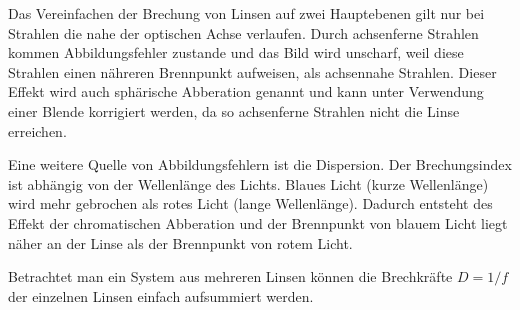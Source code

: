 Das Vereinfachen der Brechung von Linsen auf zwei Hauptebenen gilt nur bei Strahlen die nahe der optischen Achse verlaufen.
Durch achsenferne Strahlen kommen Abbildungsfehler zustande und das Bild wird unscharf, weil diese Strahlen einen nähreren Brennpunkt aufweisen, als achsennahe Strahlen.
Dieser Effekt wird auch sphärische Abberation genannt und kann unter Verwendung einer Blende korrigiert werden, da so achsenferne Strahlen nicht die Linse erreichen.

Eine weitere Quelle von Abbildungsfehlern ist die Dispersion.
Der Brechungsindex ist abhängig von der Wellenlänge des Lichts.
Blaues Licht (kurze Wellenlänge) wird mehr gebrochen als rotes Licht (lange Wellenlänge).
Dadurch entsteht des Effekt der chromatischen Abberation und der Brennpunkt von blauem Licht liegt näher an der Linse als der Brennpunkt von rotem Licht.

Betrachtet man ein System aus mehreren Linsen können die Brechkräfte $D=1/f$ der einzelnen Linsen einfach aufsummiert werden.
